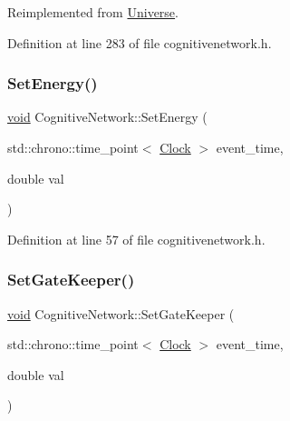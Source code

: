 Reimplemented from \mbox{\hyperlink{class_universe_a608aa95698380f791a0ffba45cc1bee3}{Universe}}.



Definition at line 283 of file cognitivenetwork.\+h.

\mbox{\label{class_cognitive_network_af2f96107858445a0b7be2be6af5b5c01}} 
\subsubsection{\texorpdfstring{Set\+Energy()}{SetEnergy()}}
{\footnotesize\ttfamily \mbox{\hyperlink{glad_8h_a950fc91edb4504f62f1c577bf4727c29}{void}} Cognitive\+Network\+::\+Set\+Energy (\begin{DoxyParamCaption}\item[{std\+::chrono\+::time\+\_\+point$<$ \mbox{\hyperlink{universe_8h_a0ef8d951d1ca5ab3cfaf7ab4c7a6fd80}{Clock}} $>$}]{event\+\_\+time,  }\item[{double}]{val }\end{DoxyParamCaption})\hspace{0.3cm}{\ttfamily [inline]}}



Definition at line 57 of file cognitivenetwork.\+h.

\mbox{\label{class_cognitive_network_a83bc4047721417212fa1bbbfa64da5ee}} 
\subsubsection{\texorpdfstring{Set\+Gate\+Keeper()}{SetGateKeeper()}}
{\footnotesize\ttfamily \mbox{\hyperlink{glad_8h_a950fc91edb4504f62f1c577bf4727c29}{void}} Cognitive\+Network\+::\+Set\+Gate\+Keeper (\begin{DoxyParamCaption}\item[{std\+::chrono\+::time\+\_\+point$<$ \mbox{\hyperlink{universe_8h_a0ef8d951d1ca5ab3cfaf7ab4c7a6fd80}{Clock}} $>$}]{event\+\_\+time,  }\item[{double}]{val }\end{DoxyParamCaption})\hspace{0.3cm}{\ttfamily [inline]}}



